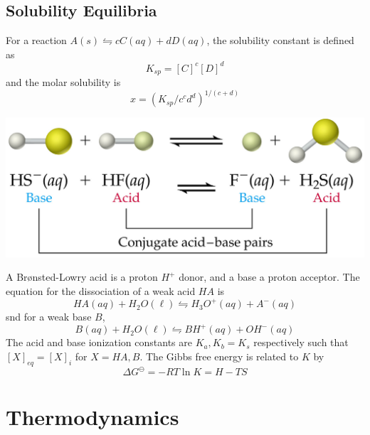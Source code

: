 \documentclass{tufte-book}
\begin{document}
\section{Solubility Equilibria}
For a reaction $A(s) \leftrightharpoons cC(aq) + dD(aq)$, the solubility constant is defined as \begin{equation}
  K_{sp} = [C]^c [D]^d
\end{equation}
and the molar solubility is \begin{equation}
  x = (K_{sp}/c^cd^d)^{1/(c+d)}
\end{equation}
%
\begin{marginfigure}[5mm]
\begin{center}
  \includegraphics[width=\textwidth]{acidbase}
\end{center}
\end{marginfigure}
%
A Brønsted-Lowry acid is a proton $H^+$ donor, and a base a proton acceptor. The equation for the dissociation of a weak acid $HA$ is \begin{equation}
  HA(aq) + H_2O (\ell) \leftrightharpoons H_3O^+ (aq) + A^- (aq)
\end{equation}
snd for a weak base $B$,
\begin{equation}
  B(aq) + H_2O (\ell) \leftrightharpoons BH^+ (aq) + OH^-(aq)
\end{equation}
The acid and base ionization constants are $K_a,K_b = K_s$ respectively such that $[X]_{eq} = [X]_i$ for $X = HA, B$. The Gibbs free energy is related to $K$ by \begin{equation}
\Delta G^\ominus = -RT \ln K = H-TS
\end{equation}

\chapter{Thermodynamics}
\end{document}
